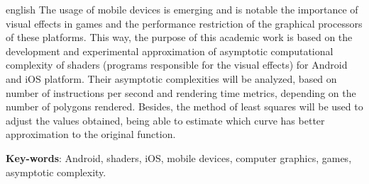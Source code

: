 \begin{resumo}[Abstract]
 \begin{otherlanguage*}{english}
  	The usage of mobile devices is emerging and is notable the importance of visual effects in games and the performance restriction of the graphical processors of these platforms. This way, the purpose of this academic work is based on the development and experimental approximation of asymptotic computational complexity of shaders (programs responsible for the visual effects) for Android and iOS platform. Their asymptotic complexities will be analyzed, based on number of instructions per second and rendering time metrics, depending on the number of polygons rendered. Besides, the method of least squares will be used to adjust the values obtained, being able to estimate which curve has better approximation to the original function.  

   \vspace{\onelineskip}
 
   \noindent 
   \textbf{Key-words}: Android, shaders, iOS, mobile devices, computer graphics, games, asymptotic complexity. 
 \end{otherlanguage*}
\end{resumo}
